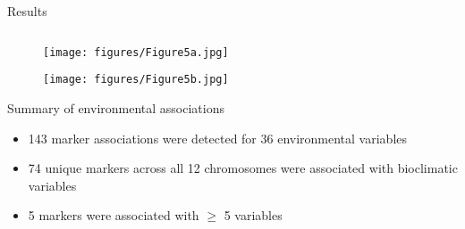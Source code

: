 \documentclass[final]{beamer}
\newlength{\onecolwid}
\newlength{\twocolwid}
\begin{document}
\begin{frame}[t]
\begin{columns}[t]
\begin{column}{\twocolwid}
\begin{block}{Results}
\begin{columns}[t,totalwidth=\twocolwid]
\begin{column}{\onecolwid}
\begin{center}
\begin{figure}
  \texttt{[image: figures/Figure5a.jpg]}
\end{figure}
\end{center}

\vspace{1cm}

\begin{center}
\begin{figure}
  \texttt{[image: figures/Figure5b.jpg]}
\end{figure}
\end{center}



\vspace{2cm}



\begin{alertblock}{Summary of environmental associations}

\begin{itemize}
  \item{143 marker associations were detected for 36 environmental variables}
  \item{74 unique markers across all 12 chromosomes were associated with bioclimatic variables}
  \item{5 markers were associated with $\ge$ 5 variables}
\end{itemize}

\end{alertblock}



\end{column} %

\end{columns} %




\end{block}
\end{column}
\end{columns}
\end{frame}
\end{document}
